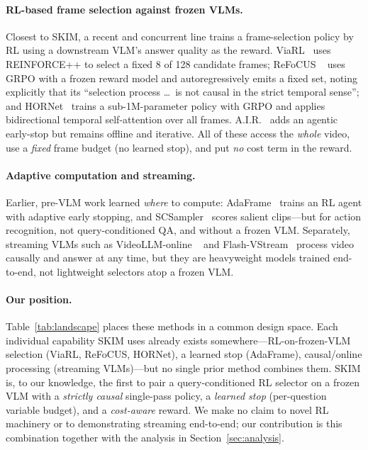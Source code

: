 \documentclass{article}
\begin{document}
\paragraph{RL-based frame selection against frozen VLMs.}
Closest to SKIM, a recent and concurrent line trains a frame-selection policy by
RL using a downstream VLM's answer quality as the reward. ViaRL~\citep{viarl}
uses REINFORCE++ to select a fixed 8 of 128 candidate frames; ReFoCUS
~\citep{refocus} uses GRPO with a frozen reward model and autoregressively emits a
fixed set, noting explicitly that its ``selection process \dots\ is not causal in
the strict temporal sense''; and HORNet~\citep{hornet} trains a sub-1M-parameter
policy with GRPO and applies bidirectional temporal self-attention over all
frames. A.I.R.~\citep{air} adds an agentic early-stop but remains offline and
iterative. All of these access the \emph{whole} video, use a \emph{fixed} frame
budget (no learned stop), and put \emph{no} cost term in the reward.

\paragraph{Adaptive computation and streaming.}
Earlier, pre-VLM work learned \emph{where} to compute: AdaFrame~\citep{adaframe}
trains an RL agent with adaptive early stopping, and SCSampler~\citep{scsampler}
scores salient clips---but for action recognition, not query-conditioned QA, and
without a frozen VLM. Separately, streaming VLMs such as VideoLLM-online
~\citep{videollmonline} and Flash-VStream~\citep{flashvstream} process video
causally and answer at any time, but they are heavyweight models trained
end-to-end, not lightweight selectors atop a frozen VLM.

\paragraph{Our position.}
Table~\ref{tab:landscape} places these methods in a common design space. Each
individual capability SKIM uses already exists somewhere---RL-on-frozen-VLM
selection (ViaRL, ReFoCUS, HORNet), a learned stop (AdaFrame), causal/online
processing (streaming VLMs)---but no single prior method combines them. SKIM is,
to our knowledge, the first to pair a query-conditioned RL selector on a frozen
VLM with a \emph{strictly causal} single-pass policy, a \emph{learned stop}
(per-question variable budget), and a \emph{cost-aware} reward. We make no claim
to novel RL machinery or to demonstrating streaming end-to-end; our contribution
is this combination together with the analysis in Section~\ref{sec:analysis}.
\end{document}
